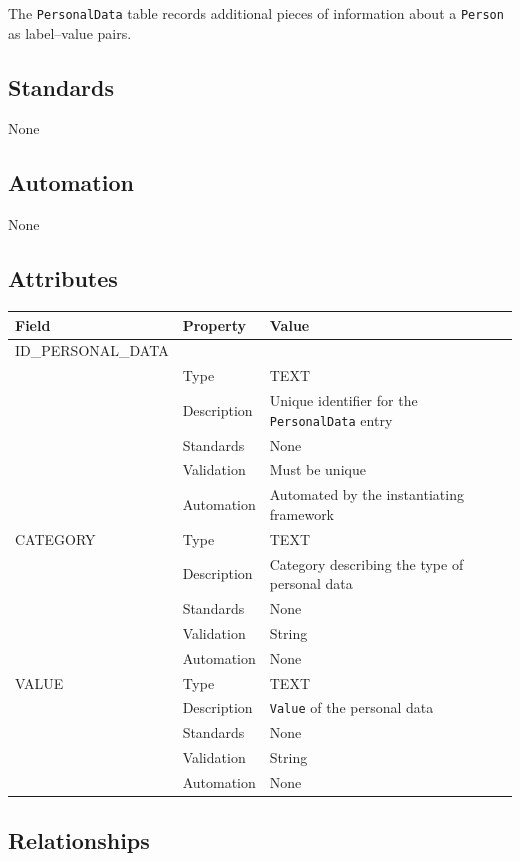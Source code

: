 \documentclass[
]{article}
\newcounter{none} %
\begin{document}
The \texttt{PersonalData} table records additional pieces of information
about a \texttt{Person} as label--value pairs.

\subsection{Standards}\label{standards-23}

None

\subsection{Automation}\label{automation-23}

None

\subsection{Attributes}\label{attributes-20}

{\def\LTcaptype{none} %
\begin{longtable}[]{@{}lll@{}}
\toprule\noalign{}
Field & Property & Value \\
\midrule\noalign{}
\endhead
\bottomrule\noalign{}
\endlastfoot
ID\_PERSONAL\_DATA & & \\
& Type & TEXT \\
& Description & Unique identifier for the \texttt{PersonalData} entry \\
& Standards & None \\
& Validation & Must be unique \\
& Automation & Automated by the instantiating framework \\
CATEGORY & Type & TEXT \\
& Description & Category describing the type of personal data \\
& Standards & None \\
& Validation & String \\
& Automation & None \\
VALUE & Type & TEXT \\
& Description & \texttt{Value} of the personal data \\
& Standards & None \\
& Validation & String \\
& Automation & None \\
\end{longtable}
}

\subsection{Relationships}\label{relationships-18}
\end{document}
